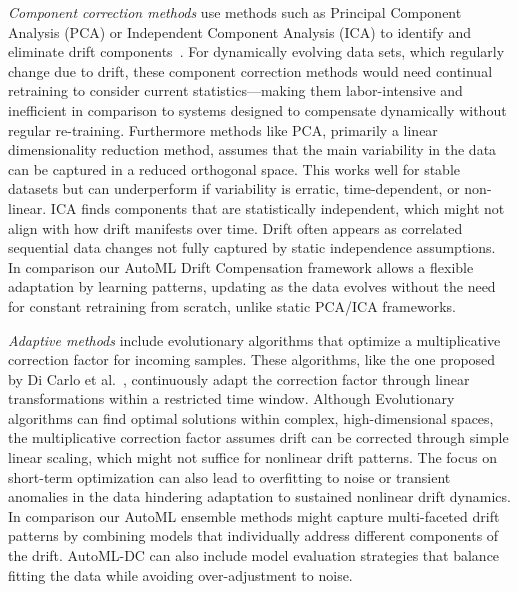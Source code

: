 \emph{Component correction methods} use methods such as Principal Component Analysis (PCA) or Independent Component Analysis (ICA) to identify and eliminate drift components~\cite{artursson2000drift, DINATALE2002158}. For dynamically evolving data sets, which regularly change due to drift, these component correction methods would need continual retraining to consider current statistics—making them labor-intensive and inefficient in comparison to systems designed to compensate dynamically without regular re-training. Furthermore methods like PCA, primarily a linear dimensionality reduction method, assumes that the main variability in the data can be captured in a reduced orthogonal space. This works well for stable datasets but can underperform if variability is erratic, time-dependent, or non-linear. ICA finds components that are statistically independent, which might not align with how drift manifests over time. Drift often appears as correlated sequential data changes not fully captured by static independence assumptions. In comparison our AutoML Drift Compensation framework allows a flexible adaptation by learning patterns, updating as the data evolves without the need for constant retraining from scratch, unlike static PCA/ICA frameworks.


\emph{Adaptive methods} include evolutionary algorithms that optimize a multiplicative correction factor for incoming samples. These algorithms, like the one proposed by Di Carlo et al.~\cite{DICARLO20111594}, continuously adapt the correction factor through linear transformations within a restricted time window. Although Evolutionary algorithms can find optimal solutions within complex, high-dimensional spaces, the multiplicative correction factor assumes drift can be corrected through simple linear scaling, which might not suffice for nonlinear drift patterns. The focus on short-term optimization can also lead to overfitting to noise or transient anomalies in the data hindering adaptation to sustained nonlinear drift dynamics. In comparison our AutoML ensemble methods might capture multi-faceted drift patterns by combining models that individually address different components of the drift. AutoML-DC can also include model evaluation strategies that balance fitting the data while avoiding over-adjustment to noise.

